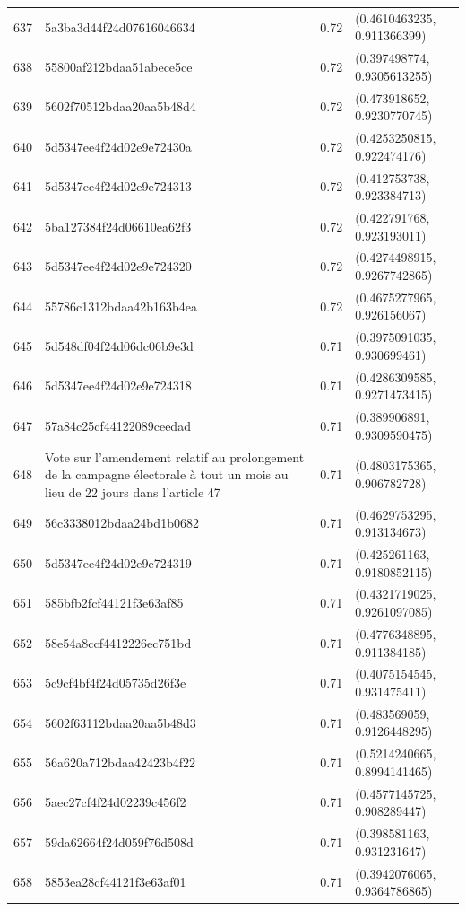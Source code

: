 \begin{table}[ht]
\begin{tabular}{rlrl}
  637 & 5a3ba3d44f24d07616046634 & 0.72 & (0.4610463235, 0.911366399) \\ 
  638 & 55800af212bdaa51abece5ce & 0.72 & (0.397498774, 0.9305613255) \\ 
  639 & 5602f70512bdaa20aa5b48d4 & 0.72 & (0.473918652, 0.9230770745) \\ 
  640 & 5d5347ee4f24d02e9e72430a & 0.72 & (0.4253250815, 0.922474176) \\ 
  641 & 5d5347ee4f24d02e9e724313 & 0.72 & (0.412753738, 0.923384713) \\ 
  642 & 5ba127384f24d06610ea62f3 & 0.72 & (0.422791768, 0.923193011) \\ 
  643 & 5d5347ee4f24d02e9e724320 & 0.72 & (0.4274498915, 0.9267742865) \\ 
  644 & 55786c1312bdaa42b163b4ea & 0.72 & (0.4675277965, 0.926156067) \\ 
  645 & 5d548df04f24d06dc06b9e3d & 0.71 & (0.3975091035, 0.930699461) \\ 
  646 & 5d5347ee4f24d02e9e724318 & 0.71 & (0.4286309585, 0.9271473415) \\ 
  647 & 57a84c25cf44122089ceedad & 0.71 & (0.389906891, 0.9309590475) \\ 
  648 & Vote sur l'amendement relatif au prolongement de la campagne électorale à tout un mois au lieu de 22 jours dans l'article 47 & 0.71 & (0.4803175365, 0.906782728) \\ 
  649 & 56c3338012bdaa24bd1b0682 & 0.71 & (0.4629753295, 0.913134673) \\ 
  650 & 5d5347ee4f24d02e9e724319 & 0.71 & (0.425261163, 0.9180852115) \\ 
  651 & 585bfb2fcf44121f3e63af85 & 0.71 & (0.4321719025, 0.9261097085) \\ 
  652 & 58e54a8ccf4412226ec751bd & 0.71 & (0.4776348895, 0.911384185) \\ 
  653 & 5c9cf4bf4f24d05735d26f3e & 0.71 & (0.4075154545, 0.931475411) \\ 
  654 & 5602f63112bdaa20aa5b48d3 & 0.71 & (0.483569059, 0.9126448295) \\ 
  655 & 56a620a712bdaa42423b4f22 & 0.71 & (0.5214240665, 0.8994141465) \\ 
  656 & 5aec27cf4f24d02239c456f2 & 0.71 & (0.4577145725, 0.908289447) \\ 
  657 & 59da62664f24d059f76d508d & 0.71 & (0.398581163, 0.931231647) \\ 
  658 & 5853ea28cf44121f3e63af01 & 0.71 & (0.3942076065, 0.9364786865) \\ 

\end{tabular}
\end{table}
